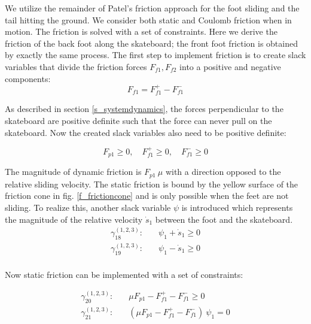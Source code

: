 \documentclass[default,iicol]{sn-jnl}
\theoremstyle{thmstyleone}%
\theoremstyle{thmstyletwo}%
\theoremstyle{thmstylethree}%
\begin{document}
We utilize the remainder of Patel's friction approach for the foot sliding and
the tail hitting the ground. We consider both static and Coulomb friction when
in motion.
The friction is solved with a set of constraints.
Here we derive the friction of the back foot along the skateboard; the front
foot friction is obtained by exactly the same process.
The first step to implement friction is to create slack variables that divide
the friction forces $F_{f1},F_{f2}$ into a positive and negative components:
%
\begin{equation} \label{e_plusminfric}
   F_{f1} = F_{f1}^+ - F_{f1}^-
\end{equation}

As described in section \ref{s_systemdynamics}, the forces perpendicular to the
skateboard are positive definite such that the force can never pull on the
skateboard. Now the created slack variables also need to be positive definite:

\begin{equation}
    F_{p1} \geq 0,\quad F_{f1}^+ \geq 0,\quad F_{f1}^- \geq 0
\end{equation}

The magnitude of dynamic friction is $F_{p1}\ \mu$ with a direction opposed to
the relative sliding velocity.
The static friction is bound by the yellow surface of the friction cone in fig.
\ref{f_frictioncone} and is only possible when the feet are not sliding.
To realize this, another slack variable $\psi$ is introduced which represents
the magnitude of the relative velocity $\dot s_1$ between the foot and the
skateboard.
%
\begin{equation}
\begin{split}
    \gamma_{18}^{(1,2,3)}: \quad & \psi_1 + \dot s_1  \geq 0 \\
    \gamma_{19}^{(1,2,3)}: \quad & \psi_1 - \dot s_1  \geq 0 \\
\end{split}
\end{equation}

Now static friction can be implemented with a set of constraints:

\begin{equation}
\begin{split}\label{e_frictioncontrol}
       \gamma_{20}^{(1,2,3)}: \quad & \mu F_{p1} - F_{f1}^+ - F_{f1}^- \geq 0 \\
       \gamma_{21}^{(1,2,3)}: \quad & (\mu F_{p1} - F_{f1}^+ - F_{f1}^-)\ \psi_1  = 0
\end{split}
\end{equation}
\end{document}
